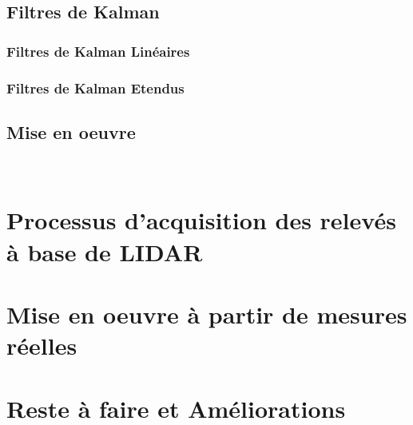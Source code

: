 \documentclass[12pt,a4paper]{report}
\begin{document}
	
	\section{Filtres de Kalman}
	
	\subsection{Filtres de Kalman Linéaires}
	
	\subsection{Filtres de Kalman Etendus}
	
	\section{Mise en oeuvre}
	
	
	\
\chapter{Processus d'acquisition des relevés à base de LIDAR}

\chapter{Mise en oeuvre à partir de mesures réelles}

\chapter{Reste à faire et Améliorations}
\end{document}
